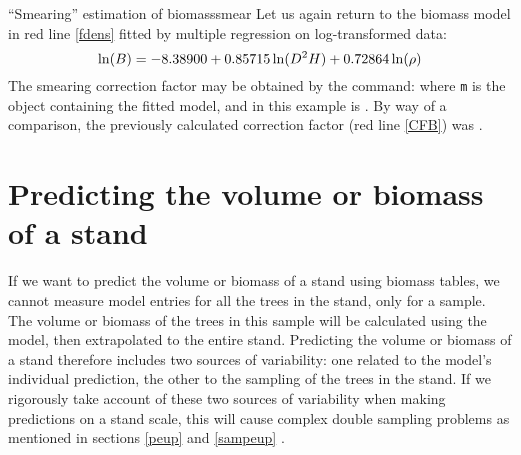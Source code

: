 \begin{filrouge}{``Smearing'' estimation of biomass}{smear}%
Let us again return to the biomass model in red line \ref{fdens} fitted by multiple regression on log-transformed data:
\[
\ln(B)=-\mbox{8.38900}+\mbox{0.85715}\ln(D^2H)+\mbox{0.72864}\ln(\rho)
\]
The smearing correction factor may be obtained by the command:
%
where \texttt{m} is the object containing the fitted model, and in this example is . By way of a comparison, the previously calculated correction factor (red line \ref{CFB}) was .
\end{filrouge}

\section{Predicting the volume or biomass of a stand}

If we want to predict the volume or biomass of a stand using biomass tables, we cannot measure model entries for all the trees in the stand, only for a sample. The volume or biomass of the trees in this sample will be calculated using the model, then extrapolated to the entire stand. Predicting the volume or biomass of a stand therefore includes two sources of variability: one related to the model's individual prediction, the other to the sampling of the trees in the stand. If we rigorously take account of these two sources of variability when making predictions on a stand scale, this will cause complex double sampling problems as mentioned in sections \ref{peup} and \ref{sampeup} \citep{parresol99}.

